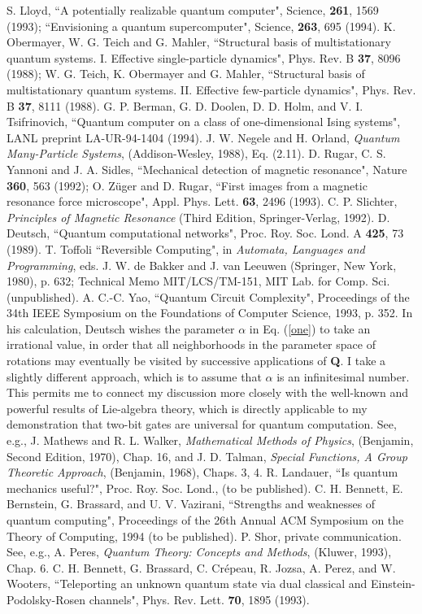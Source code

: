 \begin{references}
 S. Lloyd, ``A potentially realizable quantum computer",
Science, {\bf 261}, 1569 (1993); ``Envisioning a quantum
supercomputer", Science, {\bf 263}, 695 (1994).
 K. Obermayer, W. G. Teich and G. Mahler, ``Structural
basis of multistationary quantum systems.  I. Effective
single-particle dynamics", Phys.  Rev.  B {\bf 37}, 8096 (1988); W. G.
Teich, K. Obermayer and G. Mahler, ``Structural basis of
multistationary quantum systems.  II.  Effective few-particle
dynamics", Phys.  Rev.  B {\bf 37}, 8111 (1988).
 G. P. Berman, G. D. Doolen, D. D. Holm, and V. I. Tsifrinovich,
``Quantum computer on a class of one-dimensional Ising systems", LANL preprint
LA-UR-94-1404 (1994).
 J. W. Negele and H. Orland, {\em Quantum Many-Particle
Systems}, (Addison-Wesley, 1988), Eq. (2.11).
 D. Rugar, C. S. Yannoni and J. A. Sidles, ``Mechanical
detection of magnetic resonance", Nature {\bf 360}, 563 (1992); O.
Z\"{u}ger and D. Rugar, ``First images from a magnetic resonance force
microscope", Appl.  Phys.  Lett.  {\bf 63}, 2496 (1993).
 C. P. Slichter, {\em Principles of Magnetic Resonance}
(Third Edition, Springer-Verlag, 1992).
 D. Deutsch, ``Quantum computational networks",
Proc. Roy. Soc. Lond. A {\bf 425}, 73 (1989).
 T. Toffoli ``Reversible Computing", in {\em Automata,
Languages and Programming}, eds. J. W. de Bakker and J. van Leeuwen (Springer,
New York, 1980), p. 632; Technical Memo MIT/LCS/TM-151, MIT Lab. for
Comp. Sci. (unpublished).
 A. C.-C. Yao, ``Quantum Circuit Complexity", Proceedings of the
34th IEEE Symposium on the Foundations of Computer Science, 1993, p. 352.
 In his calculation, Deutsch wishes the parameter $\alpha$ in
Eq. (\ref{one})
to take an irrational value, in order that all neighborhoods
in the parameter space of rotations may eventually be visited by successive
applications of {\bf Q}.  I take a slightly different approach, which
is to assume that $\alpha$ is an infinitesimal number.  This permits me
to connect my discussion more closely with the well-known and powerful
results of Lie-algebra theory, which is directly applicable to my
demonstration that two-bit gates are universal for quantum computation.
 See, e.g., J. Mathews and R. L. Walker, {\em Mathematical
Methods of Physics}, (Benjamin, Second Edition, 1970), Chap. 16, and J.
D. Talman, {\em Special Functions, A Group Theoretic Approach}, (Benjamin,
1968), Chaps. 3, 4.
 R. Landauer, ``Is quantum mechanics useful?", Proc.
Roy. Soc. Lond., (to be published).
 C. H. Bennett, E. Bernstein, G. Brassard, and U. V. Vazirani,
``Strengths and weaknesses of quantum computing", Proceedings of the
26th Annual ACM Symposium on the Theory of Computing, 1994 (to be published).
 P. Shor, private communication.
 See, e.g., A.
Peres, {\em Quantum Theory: Concepts and Methods},
(Kluwer, 1993), Chap. 6.
 C. H. Bennett, G. Brassard, C. Cr\'epeau, R. Jozsa, A. Perez,
and W. Wooters, ``Teleporting an unknown quantum state via dual classical
and Einstein-Podolsky-Rosen channels", Phys. Rev. Lett. {\bf 70}, 1895 (1993).
\end{references}


